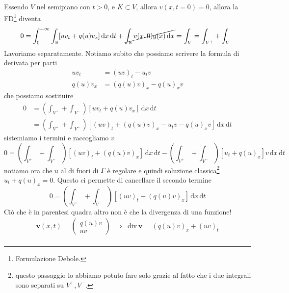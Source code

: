 \documentclass[10pt,a4paper,twoside,openright]{book}
\newcommand{\de}{\,\mathrm d}
\newcommand{\dx}{\de x}
\newcommand{\dt}{\de t}
\begin{document}
\begin{dimostrazione}
\begin{figure}[H]
\begin{tikzpicture}[x=0.75pt,y=0.75pt,yscale=-1,xscale=1]
        \end{tikzpicture}
    \end{figure}
    \FloatBarrier

    Essendo $V$ nel semipiano con $t >0$, e $K\subset V$, allora $v(x,t=0) =0$, allora la FD\footnote{Formulazione Debole.} diventa
    \begin{equation*}
        0=\int ^{+\infty }_{0}\int _{\mathbb{R}}[ uv_{t} +q(u) v_{x}] \dx\dt+\cancel{\int _{\mathbb{R}} v(x,0) g(x) \dx} =\int _{V} =\int _{V^{+}} +\int _{V^{-}}
    \end{equation*}
    Lavoriamo separatamente. Notiamo subito che possiamo scrivere la formula di derivata per parti
    \begin{align*}
        uv_{t}     & =(uv)_{t} -u_{t} v        \\
        q(u) v_{x} & =(q(u) v)_{x} -q(u)_{x} v
    \end{align*}
    che possiamo sostituire
    \begin{align*}
        0 & =\left(\int _{V^{+}} +\int _{V^{-}}\right)[ uv_{t} +q(u) v_{x}] \dx\dt                        \\
          & =\left(\int _{V^{+}} +\int _{V^{-}}\right)[(uv)_{t} +(q(u) v)_{x} -u_{t} v-q(u)_{x} v] \dx\dt
    \end{align*}
    sistemiamo i termini e raccogliamo $v$
    \begin{equation*}
        0=\left(\int _{V^{+}} +\int _{V^{-}}\right)[(uv)_{t} +(q(u) v)_{x}] \dx\dt-\left(\int _{V^{+}} +\int _{V^{-}}\right)[ u_{t} +q(u)_{x}] v\dx\dt
    \end{equation*}
    notiamo ora che $u$ al di fuori di $\Gamma $ è regolare e quindi soluzione classica\footnote{questo passaggio lo abbiamo potuto fare solo grazie al fatto che i due integrali sono separati su $V^{+} ,V^{-}$.} $u_{t} +q(u)_{x} =0$. Questo ci permette di cancellare il secondo termine
    \begin{equation*}
        0=\left(\int _{V^{+}} +\int _{V^{-}}\right)[(uv)_{t} +(q(u) v)_{x}] \dx\dt
    \end{equation*}
    Ciò che è in parentesi quadra altro non è che la divergenza di una funzione!
    \begin{gather*}
        \mathbf{v}(x,t) =
        \begin{pmatrix}
            q(u) v \\
            uv
        \end{pmatrix} \ \ \Rightarrow \ \ \mathrm{div} \ \mathbf{v} =(q(u) v)_{x} +(uv)_{t}\\

\end{gather*}
\end{dimostrazione}
\end{document}
